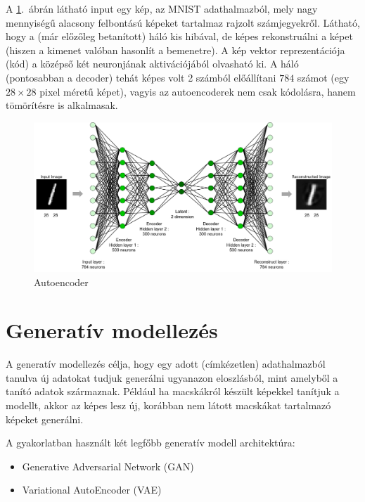 A \ref{AE_arch2}.~ábrán látható input egy kép, az MNIST adathalmazból, mely nagy mennyiségű alacsony felbontású képeket tartalmaz rajzolt számjegyekről. Látható, hogy a (már előzőleg betanított) háló kis hibával, de képes rekonstruálni a képet (hiszen a kimenet valóban hasonlít a bemenetre). A kép vektor reprezentációja (kód) a középső két neuronjának aktivációjából olvasható ki. A háló (pontosabban a decoder) tehát képes volt 2 számból előállítani $784$ számot (egy $28\times 28$ pixel méretű képet), vagyis az autoencoderek nem csak kódolásra, hanem tömörítésre is alkalmasak.

\begin{figure}[h!]
\begin{center}
  
 
 \begin{center}
	\includegraphics[width=\linewidth]{AE_arch2.png}
 \end{center}

  \caption{Autoencoder}\label{AE_arch2}
\end{center}
\end{figure}

\section{Generatív modellezés}

A generatív modellezés célja, hogy egy adott (címkézetlen) adathalmazból tanulva új adatokat tudjuk generálni ugyanazon eloszlásból, mint amelyből a tanító adatok származnak. Például ha macskákról készült képekkel tanítjuk a modellt, akkor az képes lesz új, korábban nem látott macskákat tartalmazó képeket generálni.

A gyakorlatban használt két legfőbb generatív modell architektúra:
\begin{itemize}
  \item Generative Adversarial Network (GAN)
  \item Variational AutoEncoder (VAE)
\end{itemize}

